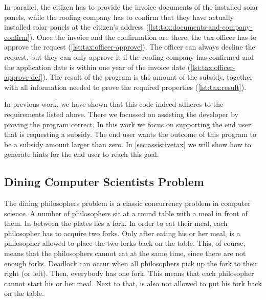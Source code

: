 In parallel, the citizen has to provide the invoice documents of the installed solar panels, while the roofing company has to confirm that they have actually installed solar panels at the citizen's address (\cref{lst:tax:documents-and-company-confirm}).
Once the invoice and the confirmation are there, the tax officer has to approve the request (\cref{lst:tax:officer-approve}).
The officer can always decline the request, but they can only approve it if the roofing company has confirmed and the application date is within one year of the invoice date (\cref{lst:tax:officer-approve-def}).
The result of the program is the amount of the subsidy, together with all information needed to prove the required properties (\cref{lst:tax:result}).

In previous work, we have shown that this code indeed adheres to the requirements listed above.
There we focussed on assisting the developer by proving the program correct.
In this work we focus on supporting the end user that is requesting a subsidy.
The end user wants the outcome of this program to be a subsidy amount larger than zero.
In \cref{sec:assistivetax} we will show how to generate hints for the end user to reach this goal.


\subsection{Dining Computer Scientists Problem}
\label{sec:dining}

The dining philosophers problem is a classic concurrency problem in computer science.
A number of philosophers sit at a round table with a meal in front of them.
In between the plates lies a fork.
In order to eat their meal, each philosopher has to acquire two forks.
Only after eating his or her meal, is a philosopher allowed to place the two forks back on the table.
This, of course, means that the philosophers cannot eat at the same time, since there are not enough forks.
Deadlock can occur when all philosophers pick up the fork to their right (or left).
Then, everybody has one fork.
This means that each philosopher cannot start his or her meal.
Next to that, is also not allowed to put his fork back on the table.\\

